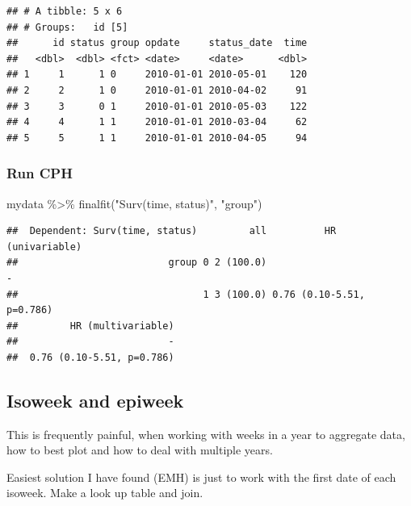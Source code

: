 \documentclass[
]{book}
\newenvironment{Shaded}{\begin{snugshade}}{\end{snugshade}}
\newcommand{\FunctionTok}[1]{\textcolor[rgb]{0.00,0.00,0.00}{#1}}
\newcommand{\NormalTok}[1]{#1}
\newcommand{\SpecialCharTok}[1]{\textcolor[rgb]{0.00,0.00,0.00}{#1}}
\newcommand{\StringTok}[1]{\textcolor[rgb]{0.31,0.60,0.02}{#1}}
\begin{document}
\begin{verbatim}
## # A tibble: 5 x 6
## # Groups:   id [5]
##      id status group opdate     status_date  time
##   <dbl>  <dbl> <fct> <date>     <date>      <dbl>
## 1     1      1 0     2010-01-01 2010-05-01    120
## 2     2      1 0     2010-01-01 2010-04-02     91
## 3     3      0 1     2010-01-01 2010-05-03    122
## 4     4      1 1     2010-01-01 2010-03-04     62
## 5     5      1 1     2010-01-01 2010-04-05     94
\end{verbatim}

\hypertarget{run-cph}{%
\subsubsection{Run CPH}\label{run-cph}}

\begin{Shaded}
\begin{Highlighting}[]
\NormalTok{mydata }\SpecialCharTok{\%\textgreater{}\%} 
  \FunctionTok{finalfit}\NormalTok{(}\StringTok{"Surv(time, status)"}\NormalTok{, }\StringTok{"group"}\NormalTok{)}
\end{Highlighting}
\end{Shaded}

\begin{verbatim}
##  Dependent: Surv(time, status)         all          HR (univariable)
##                          group 0 2 (100.0)                         -
##                                1 3 (100.0) 0.76 (0.10-5.51, p=0.786)
##         HR (multivariable)
##                          -
##  0.76 (0.10-5.51, p=0.786)
\end{verbatim}

\hypertarget{isoweek-and-epiweek}{%
\subsection{Isoweek and epiweek}\label{isoweek-and-epiweek}}

This is frequently painful, when working with weeks in a year to aggregate data, how to best plot and how to deal with multiple years.

Easiest solution I have found (EMH) is just to work with the first date of each isoweek. Make a look up table and join.
\end{document}
